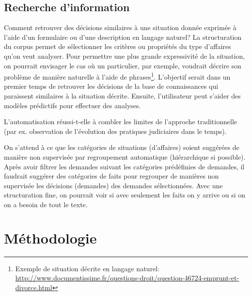 \subsection{Recherche d'information}
Comment retrouver des décisions similaires à une situation donnée exprimée à l'aide d'un formulaire ou d'une description en langage naturel? La structuration du corpus permet de sélectionner les critères ou propriétés du type d'affaires qu'on veut analyser. Pour permettre une plus grande expressivité de la situation, on pourrait envisager le cas où un particulier, par exemple, voudrait décrire son problème de manière naturelle à l'aide de phrases\footnote{Exemple de situation décrite en langage naturel: \url{http://www.documentissime.fr/questions-droit/question-46724-emprunt-et-divorce.html}}. L'objectif serait dans un premier temps de retrouver les décisions de la base de connaissances qui paraissent similaires à la situation décrite. Ensuite, l'utilisateur  peut s'aider des modèles prédictifs pour effectuer des analyses.

L'automatisation réussi-t-elle à combler les limites de l'approche traditionnelle (par ex. observation de l'évolution des pratiques judiciaires dans le temps).

On s'attend à ce que les catégories de situations (d'affaires) soient suggérées de manière non supervisée par regroupement automatique (hiérarchique si possible). Après avoir filtrer les demandes suivant les catégories prédéfinies de demandes, il faudrait suggérer des catégories de faits pour regrouper de manières non supervisée les décisions (demandes) des demandes sélectionnées. Avec une structuration fine, on pourrait voir si avec seulement les faits on y arrive ou si on on a besoin de tout le texte.


\section{Méthodologie}
\label{sec:intro:methodologie}


